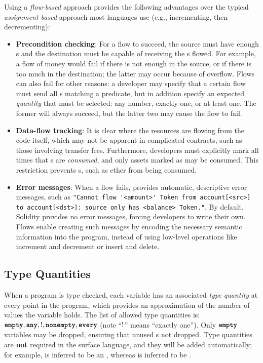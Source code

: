 \documentclass[dvipsnames, usenames, sigconf]{acmart}
\begin{document}
Using a \emph{flow-based} approach provides the following advantages over the typical \emph{assignment-based} approach most languages use (e.g., incrementing, then decrementing):
\begin{itemize}
    \item \textbf{Precondition checking}: For a flow to succeed, the source must have enough \assetTxt{}s and the destination must be capable of receiving the \assetTxt{}s flowed.
        For example, a flow of money would fail if there is not enough in the source, or if there is too much in the destination; the latter may occur because of overflow.
        Flows can also fail for other reasons: a developer may specify that a certain flow must send all \assetTxt{}s matching a predicate, but in addition specify an expected \emph{quantity} that must be selected: any number, exactly one, or at least one.
        The former will always succeed, but the latter two may cause the flow to fail.
    \item \textbf{Data-flow tracking}: It is clear where the resources are flowing from the code itself, which may not be apparent in complicated contracts, such as those involving transfer fees.
        Furthermore, developers must explicitly mark all times that \assetTxt{}s are \emph{consumed}, and only assets marked as  may be consumed.
        This restriction prevents \assetTxt{}s, such as ether from being consumed.
    \item \textbf{Error messages}: When a flow fails, \langName provides automatic, descriptive error messages, such as \lstinline{"Cannot flow '<amount>' Token from account[<src>] to account[<dst>]: source only has <balance> Token."}.
        By default, Solidity provides no error messages, forcing developers to write their own.
        Flows enable creating such messages by encoding the necessary semantic information into the program, instead of using low-level operations like increment and decrement or insert and delete.
\end{itemize}

\subsection{Type Quantities}
When a \langName program is type checked, each variable has an associated \emph{type quantity} at every point in the program, which provides an approximation of the number of values the variable holds.
The list of allowed type quantities is: $\textbf{\texttt{empty}}, \textbf{\texttt{any}}, !, \textbf{\texttt{nonempty}}, \textbf{\texttt{every}}$ (note ``$!$'' means ``exactly one'').
Only $\textbf{\texttt{empty}}$ \assetTxt variables may be dropped, ensuring that unused \assetTxt{}s not dropped.
Type quantities are \textbf{not} required in the surface language, and they will be added automatically; for example,  is inferred to be an , whereas  is inferred to be .
\end{document}
